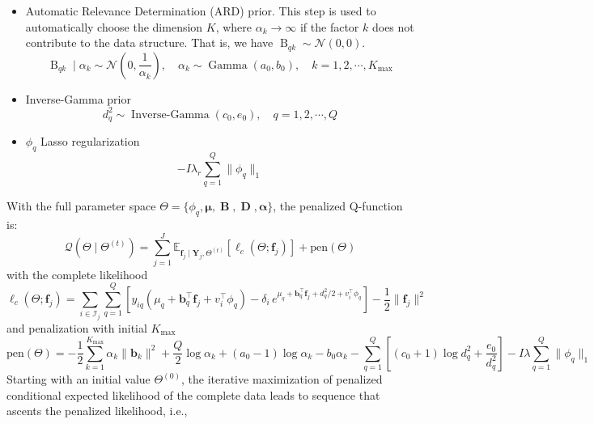 \documentclass[]{report}
\theoremstyle{definition}
\begin{document}
\begin{itemize}
    \item Automatic Relevance Determination (ARD) prior. This step is used to automatically choose the dimension $K$, where $\alpha_{k}\to \infty$ if the factor $k$ does not contribute to the data structure. That is, we have $\operatorname{B}_{qk}\sim \mathcal{N}(0,0)$.
    \begin{equation}
    \operatorname{B}_{qk}\mid \alpha_{k} \sim \mathcal{N}(0,\frac{1}{\alpha_{k}}), \quad \alpha_{k}\sim \operatorname{Gamma}(a_0, b_0), \quad k=1,2,\cdots , K_{\text{max}}
    \end{equation}
    \item Inverse-Gamma prior
        \begin{equation}
            d^{2}_{q}\sim \operatorname{Inverse-Gamma}(c_0, e_0), \quad q=1,2,\cdots , Q
        \end{equation}
    \item $\phi_q$ Lasso regularization 
        \begin{equation}
            -I\lambda_{r}\sum_{q=1}^{Q} \|\phi_{q}\|_1
        \end{equation}
\end{itemize}
With the full parameter space $\Theta=\{\phi_q, \bm{\mu}, \bm{\operatorname{B}}, \bm{\operatorname{D}}, \bm{\alpha}\}$, the penalized Q-function is:
\begin{equation}
    \mathcal{Q}(\Theta \mid \Theta^{(t)}) = \sum_{j=1}^{J} \mathbb{E}_{\mathbf{f}_j \mid \mathbf{Y}_j, \Theta^{(t)}} \left[ \ell_c(\Theta; \mathbf{f}_j) \right] + \text{pen}(\Theta)
\end{equation}
with the complete likelihood 
\begin{equation}
    \ell_c(\Theta; \mathbf{f}_j) = \sum_{i \in \mathcal{I}_j} \sum_{q=1}^{Q} \left[ y_{iq} \left( \mu_q + \mathbf{b}_q^\top \mathbf{f}_j + v_i^\top \phi_q \right) - \delta_i \, e^{\mu_q + \mathbf{b}_q^\top \mathbf{f}_j + d_q^2/2 + v_{i}^\top \phi_q} \right] - \frac{1}{2} \|\mathbf{f}_j\|^2
\end{equation}
and penalization with initial $K_{\text{max}}$
\begin{equation}
    \text{pen}(\Theta) = -\frac{1}{2} \sum_{k=1}^{K_{\max}} \alpha_k \|\mathbf{b}_k\|^2 + \frac{Q}{2} \log \alpha_k + (a_0 - 1) \log \alpha_k - b_0 \alpha_k - \sum_{q=1}^{Q} \left[ (c_0 + 1) \log d_q^2 + \frac{e_0}{d_q^2} \right] - I\lambda \sum_{q=1}^{Q} \|\phi_q\|_1
\end{equation}
Starting with an initial value $\Theta^{(0)}$, the iterative maximization of penalized conditional expected likelihood of the complete data leads to sequence that ascents the penalized likelihood, i.e., 
\end{document}
